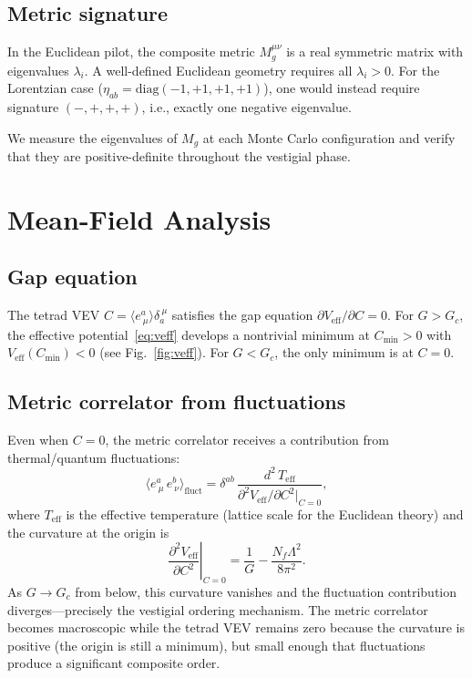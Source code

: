\documentclass[aps,prd,twocolumn,superscriptaddress,nofootinbib]{revtex4-2}
\newcommand{\vev}[1]{\langle #1 \rangle}
\newcommand{\Gc}{G_c}
\newcommand{\Nf}{N_f}
\newcommand{\Veff}{V_{\mathrm{eff}}}
\begin{document}
\subsection{Metric signature}

In the Euclidean pilot, the composite metric $M_g^{\mu\nu}$ is
a real symmetric matrix with eigenvalues $\lambda_i$. A well-defined
Euclidean geometry requires all $\lambda_i > 0$. For the Lorentzian
case ($\eta_{ab} = \mathrm{diag}(-1,+1,+1,+1)$), one would instead
require signature $(-,+,+,+)$, i.e., exactly one negative eigenvalue.

We measure the eigenvalues of $M_g$ at each Monte Carlo configuration
and verify that they are positive-definite throughout the vestigial phase.

\section{Mean-Field Analysis}
\label{sec:mean_field}

\subsection{Gap equation}

The tetrad VEV $C = \vev{e^a_{\ \mu}}\delta_a^{\ \mu}$ satisfies the
gap equation $\partial\Veff/\partial C = 0$. For $G > \Gc$, the
effective potential~\eqref{eq:veff} develops a nontrivial minimum at
$C_{\min} > 0$ with $\Veff(C_{\min}) < 0$ (see Fig.~\ref{fig:veff}).
For $G < \Gc$, the only minimum is at $C = 0$.

\subsection{Metric correlator from fluctuations}

Even when $C = 0$, the metric correlator receives a contribution from
thermal/quantum fluctuations:
\begin{equation}
\vev{e^a_{\ \mu}\, e^b_{\ \nu}}_{\mathrm{fluct}}
  = \delta^{ab}\,\frac{d^2\, T_{\mathrm{eff}}}
  {\partial^2\Veff/\partial C^2\big|_{C=0}},
\label{eq:fluct}
\end{equation}
where $T_{\mathrm{eff}}$ is the effective temperature (lattice scale
for the Euclidean theory) and the curvature at the origin is
\begin{equation}
\left.\frac{\partial^2\Veff}{\partial C^2}\right|_{C=0}
  = \frac{1}{G} - \frac{\Nf\Lambda^2}{8\pi^2}.
\label{eq:curvature}
\end{equation}
As $G \to \Gc$ from below, this curvature vanishes and the fluctuation
contribution diverges---precisely the vestigial ordering mechanism. The
metric correlator becomes macroscopic while the tetrad VEV remains zero
because the curvature is positive (the origin is still a minimum), but
small enough that fluctuations produce a significant composite order.
\end{document}

